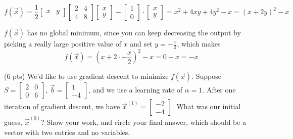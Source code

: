 \documentclass[11pt]{article}
\begin{document}
\begin{prob}
\begin{subprob}
\begin{solution}
$$f(\vec x) = \frac{1}{2} \begin{bmatrix} x & y \end{bmatrix} \begin{bmatrix} 2 & 4 \\ 4 & 8 \end{bmatrix} \begin{bmatrix} x \\ y \end{bmatrix} - \begin{bmatrix} 1 \\ 0 \end{bmatrix} \cdot \begin{bmatrix} x \\ y \end{bmatrix} = x^2 + 4xy + 4y^2 - x = (x + 2y)^2 - x$$

$f(\vec x)$ has no global minimum, since you can keep decreasing the output by picking a really large positive value of $x$ and set $y = -\frac{x}{2}$, which makes $$f(\vec x) = (x + 2 \cdot -\frac{x}{2})^2 - x = 0 - x = -x$$

\end{solution}
\end{subprob}

\vspace{-0.1in}

\begin{subprob}(6 pts) We'd like to use gradient descent to minimize $f(\vec x)$. Suppose $S = \begin{bmatrix} 2 & 0 \\ 0 & 6 \end{bmatrix}$, $\vec b = \begin{bmatrix} 1 \\ -4 \end{bmatrix}$, and we use a learning rate of $\alpha = 1$. After one iteration of gradient descent, we have $\vec x^{(1)} = \begin{bmatrix} - 2 \\ -4 \end{bmatrix}$. What was our initial guess, $\vec x^{(0)}$? Show your work, and $\boxed{\text{circle}}$ your final answer, which should be a vector with two entries and no variables. \\

\emptybox{8.25cm}


\end{subprob}
\end{prob}
\end{document}
